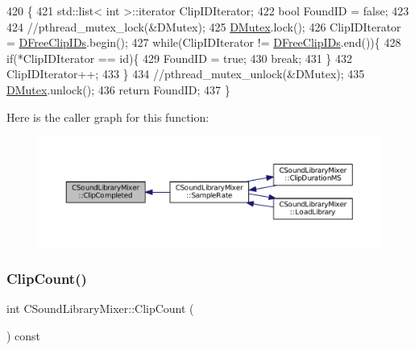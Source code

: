 \begin{DoxyCode}
420                                             \{
421     std::list< int >::iterator ClipIDIterator;
422     \textcolor{keywordtype}{bool} FoundID = \textcolor{keyword}{false};
423     
424     \textcolor{comment}{//pthread\_mutex\_lock(&DMutex);}
425     \hyperlink{classCSoundLibraryMixer_a955562a0638df831413a1c6b8860f9fb}{DMutex}.lock();
426     ClipIDIterator = \hyperlink{classCSoundLibraryMixer_a32956ae09580a1ae4c9c037f0f7b5c0b}{DFreeClipIDs}.begin();
427     \textcolor{keywordflow}{while}(ClipIDIterator != \hyperlink{classCSoundLibraryMixer_a32956ae09580a1ae4c9c037f0f7b5c0b}{DFreeClipIDs}.end())\{
428         \textcolor{keywordflow}{if}(*ClipIDIterator == \textcolor{keywordtype}{id})\{
429             FoundID = \textcolor{keyword}{true};
430             \textcolor{keywordflow}{break};
431         \}
432         ClipIDIterator++;
433     \}
434     \textcolor{comment}{//pthread\_mutex\_unlock(&DMutex); }
435     \hyperlink{classCSoundLibraryMixer_a955562a0638df831413a1c6b8860f9fb}{DMutex}.unlock();
436     \textcolor{keywordflow}{return} FoundID;
437 \}
\end{DoxyCode}
Here is the caller graph for this function\+:\nopagebreak
\begin{figure}[H]
\begin{center}
\leavevmode
\includegraphics[width=350pt]{classCSoundLibraryMixer_acd11bc59b6f11b1a8e1f0e821f0b8207_icgraph}
\end{center}
\end{figure}
\hypertarget{classCSoundLibraryMixer_a3abff4a43967eb0975ded98011c23e4e}{}\label{classCSoundLibraryMixer_a3abff4a43967eb0975ded98011c23e4e} 
\subsubsection{\texorpdfstring{Clip\+Count()}{ClipCount()}}
{\footnotesize\ttfamily int C\+Sound\+Library\+Mixer\+::\+Clip\+Count (\begin{DoxyParamCaption}{ }\end{DoxyParamCaption}) const\hspace{0.3cm}{\ttfamily [inline]}}



